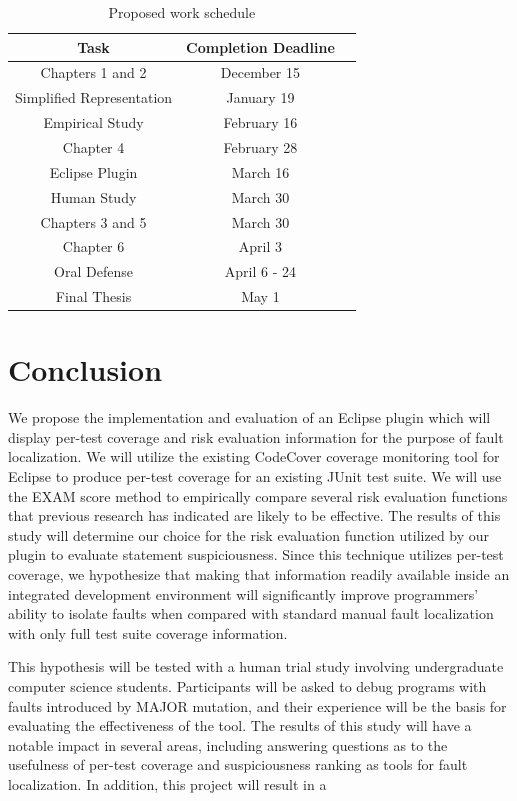 \documentclass[11pt]{article}
\begin{document}
\begin{table}[h]
\centering
\begin{tabular}{|c||c|c|}
\hline
\bf Task & \bf Completion Deadline\\\hline\hline
Chapters 1 and 2 & December 15\\\hline
Simplified Representation& January 19\\\hline
Empirical Study & February 16\\\hline
Chapter 4 & February 28\\\hline
Eclipse Plugin & March 16\\\hline
Human Study & March 30\\\hline
Chapters 3 and 5 & March 30\\\hline
Chapter 6 & April 3\\\hline
Oral Defense & April 6 - 24\\\hline
Final Thesis & May 1\\\hline
\end{tabular}
\caption{Proposed work schedule}
\label{research}
\end{table}

\vspace*{-.1in}
\section{Conclusion}
\label{sec:conclusion}
\vspace*{-.1in}

We propose the implementation and evaluation of an Eclipse plugin which will
display per-test coverage and risk evaluation information for the purpose of fault localization.  We
will utilize the existing CodeCover coverage monitoring tool for Eclipse to produce per-test
coverage for an existing JUnit test suite.  We will use the EXAM 
score method to empirically compare several risk evaluation functions
that previous research has indicated are likely to be effective.  The
results of this study will determine our choice for the risk evaluation
function utilized by our plugin to evaluate statement suspiciousness.
Since this technique utilizes per-test coverage,
we hypothesize that making that information readily available inside an
integrated development environment will significantly improve
programmers' ability to isolate faults when compared with standard 
manual fault localization with only full test suite coverage information.  

This hypothesis will be tested with a human trial study involving
undergraduate computer science students.  Participants will be asked to
debug programs with faults introduced by MAJOR mutation, and their
experience will be the basis for evaluating the effectiveness of the
tool.  The results of this study will have a notable impact
in several areas, including answering questions as to the usefulness of
per-test coverage and suspiciousness ranking as tools for fault
localization.  In addition, this project will result in a 

\newpage


\nocite{*}
\end{document}
